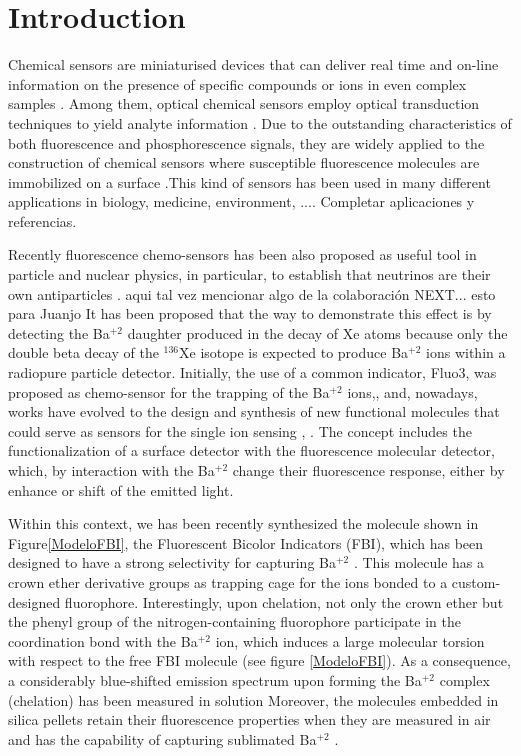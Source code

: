 \documentclass[aps,prl,reprint,longbibliography,superscriptaddress]{revtex4-1}
\def\Ba{Ba$^{+2}$ }
\newcommand{\completar}[1]{{\color{red} #1}}
\begin{document}
\section{Introduction } 
Chemical sensors are miniaturised devices that can deliver real time and on-line information on the presence of specific compounds or ions in even complex samples \cite{cammann1996cambridge}. 
 Among them, optical chemical sensors employ optical transduction techniques to yield analyte information \cite{mcdonagh_optical_2008}. Due to the outstanding characteristics of both fluorescence and phosphorescence signals, they are widely applied to the construction of chemical sensors where susceptible fluorescence molecules are immobilized on a surface \cite{wolfbeis_materials_2005}.This kind of sensors has been used in many different applications in biology, medicine, environment,  \completar{.... Completar aplicaciones y referencias}. 
 
 Recently fluorescence chemo-sensors has been also proposed as useful tool in particle and nuclear physics, in particular, to establish that neutrinos are their own antiparticles \cite{majorana_teoria_2008}. \completar{aqui tal vez mencionar algo de la colaboración NEXT... esto para Juanjo} It has been proposed that the way to demonstrate this effect is by detecting the \Ba daughter produced in the decay of Xe atoms \cite{Nygren_2015} because only the double beta decay of the $^{136}$Xe isotope is expected to produce \Ba ions within a radiopure particle detector.
 Initially, the use of a common indicator, Fluo3, was proposed as chemo-sensor for the trapping of the \Ba ions,\cite{jones_single_2016},\cite{next_collaboration_demonstration_2018} and, nowadays, works have evolved to the design and synthesis of new functional molecules that could serve as sensors for the single ion sensing \cite{thapa_barium_2019},  \cite{thapa_demonstration_2021}. The concept includes the functionalization of a surface detector with the fluorescence molecular detector, which, by interaction with the \Ba change their fluorescence response, either by enhance or shift of the emitted light.  
 
 Within this context, we has been recently synthesized the molecule shown in Figure\ref{ModeloFBI}, the Fluorescent Bicolor Indicators (FBI), which has been designed to have a strong selectivity for capturing \Ba. \cite{rivilla_fluorescent_2020} This molecule has a crown ether derivative groups as trapping cage for the ions bonded to a custom-designed fluorophore. Interestingly, upon chelation, not only the crown ether but the phenyl group of the nitrogen-containing fluorophore participate in the coordination bond with the \Ba  ion, which induces a large molecular torsion with respect to the free FBI molecule (see figure \ref{ModeloFBI}). As a consequence, a considerably blue-shifted emission spectrum upon forming the \Ba  complex (chelation) has been measured in solution\cite{rivilla_fluorescent_2020} Moreover, the molecules embedded in silica pellets retain their fluorescence properties when they are measured in air and has the capability of capturing sublimated \Ba.
 
\end{document}
